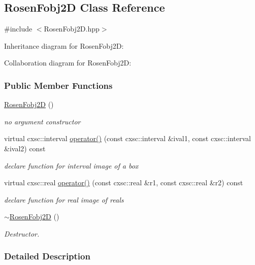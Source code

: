 \hypertarget{classRosenFobj2D}{\subsection{\-Rosen\-Fobj2\-D \-Class \-Reference}
\label{classRosenFobj2D}
}


{\ttfamily \#include $<$\-Rosen\-Fobj2\-D.\-hpp$>$}



\-Inheritance diagram for \-Rosen\-Fobj2\-D\-:


\-Collaboration diagram for \-Rosen\-Fobj2\-D\-:
\subsubsection*{\-Public \-Member \-Functions}
\begin{DoxyCompactItemize}
\item 
\hyperlink{classRosenFobj2D_a8679994a34da849e967310a3e31c6f0c}{\-Rosen\-Fobj2\-D} ()
\begin{DoxyCompactList}\small\item\em no argument constructor \end{DoxyCompactList}\item 
virtual cxsc\-::interval \hyperlink{classRosenFobj2D_a8ffb3da4785817edc98ac43b67c4d0ee}{operator()} (const cxsc\-::interval \&ival1, const cxsc\-::interval \&ival2) const 
\begin{DoxyCompactList}\small\item\em declare function for interval image of a box \end{DoxyCompactList}\item 
virtual cxsc\-::real \hyperlink{classRosenFobj2D_aa3b4b73aa5f8cfa9776b86b8df641c15}{operator()} (const cxsc\-::real \&r1, const cxsc\-::real \&r2) const 
\begin{DoxyCompactList}\small\item\em declare function for real image of reals \end{DoxyCompactList}\item 
\hyperlink{classRosenFobj2D_ad1b7aaec41cb88f0b4a7de8acbe358e5}{$\sim$\-Rosen\-Fobj2\-D} ()
\begin{DoxyCompactList}\small\item\em \-Destructor. \end{DoxyCompactList}\end{DoxyCompactItemize}


\subsubsection{\-Detailed \-Description}


